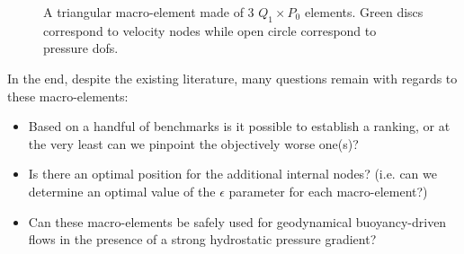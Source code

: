 \documentclass[a4paper]{article}
\begin{document}
\begin{figure}
\centering
{}
\caption{A triangular macro-element made of 3 $Q_1\times P_0$ elements.
Green discs correspond to velocity nodes while open circle correspond to pressure dofs.}\label{fig:triangle}
\end{figure}

\vspace{.4cm}


In the end, despite the existing literature, many questions remain with regards to these macro-elements:
\begin{itemize}
\item Based on a handful of benchmarks is it possible to establish a ranking, or at the very least can we pinpoint the objectively worse one(s)?

\item Is there an optimal position for the additional internal nodes? (i.e. can we determine an optimal value of the 
$\epsilon$ parameter for each macro-element?)

\item Can these macro-elements be safely used for geodynamical 
buoyancy-driven flows in the presence of a strong hydrostatic pressure gradient?
\end{itemize}







\end{document}
